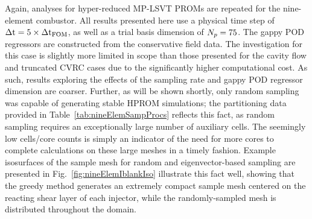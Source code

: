 Again, analyses for hyper-reduced MP-LSVT PROMs are repeated for the nine-element combustor. All results presented here use a physical time step of $\Delta \text{t} = 5 \times \Delta \text{t}_{\text{FOM}}$, as well as a trial basis dimension of $N_p = 75$. The gappy POD regressors are constructed from the conservative field data. The investigation for this case is slightly more limited in scope than those presented for the cavity flow and truncated CVRC cases due to the significantly higher computational cost. As such, results exploring the effects of the sampling rate and gappy POD regressor dimension are coarser. Further, as will be shown shortly, only random sampling was capable of generating stable HPROM simulations; the partitioning data provided in Table~\ref{tab:nineElemSampProcs} reflects this fact, as random sampling requires an exceptionally large number of auxiliary cells. The seemingly low cells/core counts is simply an indicator of the need for more cores to complete calculations on these large meshes in a timely fashion. Example isosurfaces of the sample mesh for random and eigenvector-based sampling are presented in Fig.~\ref{fig:nineElemIblankIso} illustrate this fact well, showing that the greedy method generates an extremely compact sample mesh centered on the reacting shear layer of each injector, while the randomly-sampled mesh is distributed throughout the domain.

